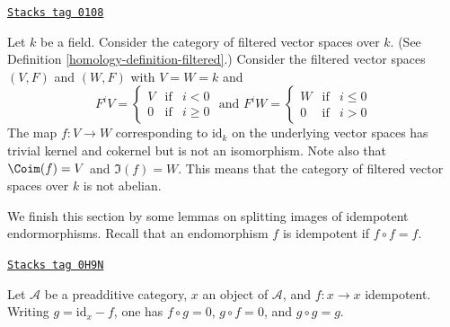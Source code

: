 \begin{example}
\label{homology-example-not-abelian}
\href{https://stacks.math.columbia.edu/tag/0108}{\texttt{Stacks tag 0108}}

Let $k$ be a field.
Consider the category
of filtered vector spaces over $k$.
(See Definition \ref{homology-definition-filtered}.)
Consider the filtered vector spaces $(V, F)$ and $(W, F)$ with
$V = W = k$ and
$$
F^iV
=
\left\{
\begin{matrix}
V & \text{if} & i < 0 \\
0 & \text{if} & i \geq 0
\end{matrix}
\right.
\text{ and }
F^iW
=
\left\{
\begin{matrix}
W & \text{if} & i \leq 0 \\
0 & \text{if} & i > 0
\end{matrix}
\right.
$$
The map $f : V \to W$ corresponding to $\text{id}_k$ on the underlying
vector spaces has trivial kernel and cokernel but is not
an isomorphism. Note also that $\Coim(f) = V$ and $\Im(f) = W$.
This means that the category of filtered vector spaces over $k$
is not abelian.
\end{example}

We finish this section by some lemmas on splitting images of
idempotent endormorphisms. Recall that an endomorphism $f$
is idempotent if $f \circ f = f$.

\begin{remark}
\label{homology-remark-idempotent-symmetry}
\href{https://stacks.math.columbia.edu/tag/0H9N}{\texttt{Stacks tag 0H9N}}

Let $\mathcal{A}$ be a preadditive category,
$x$ an object of $\mathcal{A}$,
and $f : x \to x$ idempotent.
Writing $g = \text{id} _ x - f$,
one has $f \circ g = 0$, $g \circ f = 0$, and $g \circ g = g$.
\end{remark}

